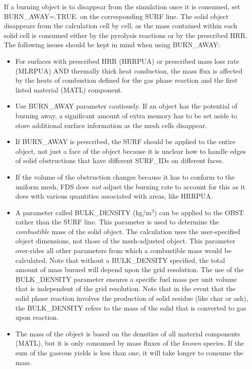 \documentclass[11pt]{book}
\begin{document}
If a burning object is to disappear from the simulation once it is consumed, set {\ct BURN\_AWAY=.TRUE.} on the corresponding {\ct SURF} line. The solid object disappears from the calculation cell by cell, as the mass contained within each solid cell is consumed either by the pyrolysis reactions or by the prescribed HRR. The following issues should be kept in mind when using {\ct BURN\_AWAY}:
\begin{itemize}
\item For surfaces with prescribed HRR ({\ct HRRPUA}) or prescribed mass loss rate ({\ct MLRPUA}) AND thermally thick heat conduction, the mass flux is affected by the heats of combustion defined for the gas phase reaction and the first listed material ({\ct MATL}) component.
\item Use {\ct BURN\_AWAY} parameter cautiously. If an object has the potential of burning away, a significant amount of extra memory has to be set aside to store additional surface information as the mesh cells disappear.
\item If {\ct BURN\_AWAY} is prescribed, the {\ct SURF} should be applied to the entire object, not just a face of the object because it is unclear how to handle edges of solid obstructions that have different {\ct SURF\_ID}s on different faces.
\item If the volume of the obstruction changes because it has to conform to the uniform mesh, FDS does {\em not} adjust the burning rate to account for this as it does with various quantities associated with areas, like {\ct HRRPUA}.
\item A parameter called {\ct BULK\_DENSITY} (kg/m$^3$) can be applied to the {\ct OBST} rather than the {\ct SURF} line. This parameter is used to determine the {\em combustible} mass of the solid object. The calculation uses the user-specified object dimensions, not those of the mesh-adjusted object. This parameter over-rides all other parameters from which a combustible mass would be calculated. Note that without a {\ct BULK\_DENSITY} specified, the total amount of mass burned will depend upon the grid resolution. The use of the {\ct BULK\_DENSITY} parameter ensures a specific fuel mass per unit volume that is independent of the grid resolution. Note that in the event that the solid phase reaction involves the production of solid residue (like char or ash), the {\ct BULK\_DENSITY} refers to the mass of the solid that is converted to gas upon reaction.
\item The mass of the object is based on the densities of all material components ({\ct MATL}), but it is only consumed by mass fluxes of the {\em known} species. If the sum of the gaseous yields is less than one, it will take longer to consume the mass.
\end{itemize}
\end{document}
